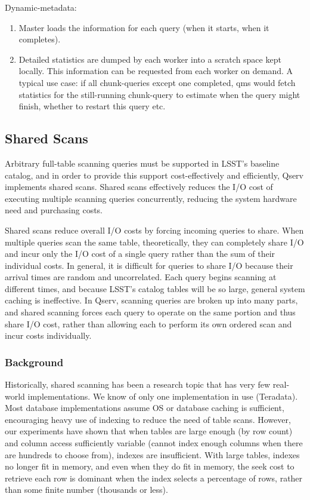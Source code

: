 \documentclass[DM,lsstdraft,toc]{lsstdoc}
\begin{document}
Dynamic-metadata:

\begin{enumerate}
\def\labelenumi{\arabic{enumi}.}
\item
  Master loads the information for each query (when it starts, when it
  completes).
\item
  Detailed statistics are dumped by each worker into a scratch space
  kept locally. This information can be requested from each worker on
  demand. A typical use case: if all chunk-queries except one completed,
  qms would fetch statistics for the still-running chunk-query to
  estimate when the query might finish, whether to restart this query
  etc.
\end{enumerate}

\subsection{Shared Scans}\label{shared-scans}

Arbitrary full-table scanning queries must be supported in LSST's
baseline catalog, and in order to provide this support cost-effectively
and efficiently, Qserv implements shared scans. Shared scans effectively
reduces the I/O cost of executing multiple scanning queries
concurrently, reducing the system hardware need and purchasing costs.

Shared scans reduce overall I/O costs by forcing incoming queries to
share. When multiple queries scan the same table, theoretically, they
can completely share I/O and incur only the I/O cost of a single query
rather than the sum of their individual costs. In general, it is
difficult for queries to share I/O because their arrival times are
random and uncorrelated. Each query begins scanning at different times,
and because LSST's catalog tables will be so large, general system
caching is ineffective. In Qserv, scanning queries are broken up into
many parts, and shared scanning forces each query to operate on the same
portion and thus share I/O cost, rather than allowing each to perform
its own ordered scan and incur costs individually.

\subsubsection{Background}\label{shared-scan-background}

Historically, shared scanning has been a research topic that has very
few real-world implementations. We know of only one implementation in
use (Teradata). Most database implementations assume OS or database
caching is sufficient, encouraging heavy use of indexing to reduce the
need of table scans. However, our experiments have shown that when
tables are large enough (by row count) and column access sufficiently
variable (cannot index enough columns when there are hundreds to choose
from), indexes are insufficient. With large tables, indexes no longer
fit in memory, and even when they do fit in memory, the seek cost to
retrieve each row is dominant when the index selects a percentage of
rows, rather than some finite number (thousands or less).
\end{document}

